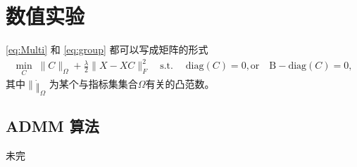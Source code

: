 \documentclass[main.tex]{subfiles}
\begin{document}
\chapter{数值实验}\label{chp:experiments}

\ref{eq:Multi} 和 \ref{eq:group} 都可以写成矩阵的形式
\begin{align}\label{eq:MatrixLasso}
  \min_{C} \; \|C\|_{\Omega}+\frac{\lambda}{2}\|X-XC\|_F^2 \quad
  \text{s.t.} \;\quad\mathrm{diag}(C)=0, \text{or} \quad \mathrm{B-diag}(C)=0,
\end{align}
其中$\|\dot\|_{\Omega}$ 为某个与指标集集合$\Omega$有关的凸范数。
\section{ADMM 算法}
未完
\end{document}
